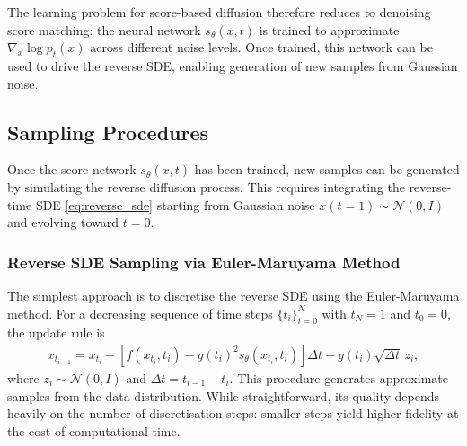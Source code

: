 \documentclass[a4paper,12pt]{article}
\begin{document}
The learning problem for score-based diffusion therefore reduces to denoising score matching: the neural network \(s_\theta(x,t)\) is trained to approximate \(\nabla_x \log p_t(x)\) across different noise levels. Once trained, this network can be used to drive the reverse SDE, enabling generation of new samples from Gaussian noise.

\subsection{Sampling Procedures}
Once the score network \(s_\theta(x,t)\) has been trained, new samples can be generated by simulating the reverse diffusion process. This requires integrating the reverse-time SDE \eqref{eq:reverse_sde} starting from Gaussian noise \(x\!\left(t=1\right) \sim \mathcal{N}(0,I)\) and evolving toward \(t=0\).

\subsubsection{Reverse SDE Sampling via Euler-Maruyama Method}
The simplest approach is to discretise the reverse SDE using the Euler-Maruyama method. For a decreasing sequence of time steps \(\{t_i\}_{i=0}^N\) with \(t_N = 1\) and \(t_0 = 0\), the update rule is
\begin{align}\label{eq:Euler-Maruyama-reverse-SDE}
    x_{t_{i-1}} = x_{t_i} + \left[f(x_{t_i},t_i) - g(t_i)^2 s_\theta(x_{t_i},t_i)\right]\Delta t + g(t_i)\sqrt{\Delta t}\,z_i,
\end{align}
where \(z_i \sim \mathcal{N}(0,I)\) and \(\Delta t = t_{i-1} - t_i\). This procedure generates approximate samples from the data distribution. While straightforward, its quality depends heavily on the number of discretisation steps: smaller steps yield higher fidelity at the cost of computational time.
\end{document}
